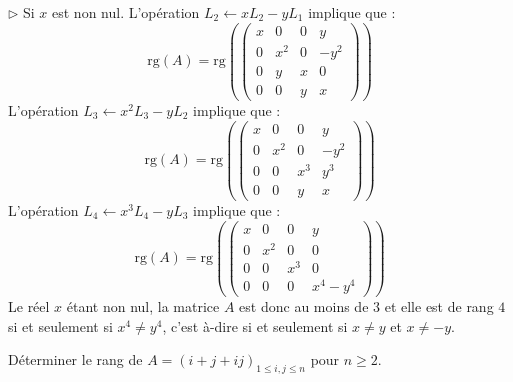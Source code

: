 \documentclass[a4paper,twoside,french,11pt]{VcCours}
\begin{document}
\noindent $\rhd$ Si $x$ est non nul. L'opération $L_2 \leftarrow x L_2 - y L_1$ implique que :
$$ \textrm{rg}(A) = \textrm{rg} \left(\begin{pmatrix}
x & 0 & 0& y \\
0 & x^2 & 0 & -y^2 \\
0 & y & x & 0 \\
0 & 0 & y & x
\end{pmatrix} \right)$$
L'opération $L_3 \leftarrow x^2 L_3-y L_2$ implique que :
$$ \textrm{rg}(A) = \textrm{rg} \left(\begin{pmatrix}
x & 0 & 0& y \\
0 & x^2 & 0 & -y^2 \\
0 & 0 & x^3 & y^3 \\
0 & 0 & y & x
\end{pmatrix} \right)$$
L'opération $L_4 \leftarrow x^3 L_4-y L_3$ implique que :
$$ \textrm{rg}(A) = \textrm{rg} \left(\begin{pmatrix}
x & 0 & 0& y \\
0 & x^2 & 0 & 0 \\
0 & 0 & x^3 & 0 \\
0 & 0 & 0 & x^4-y^4
\end{pmatrix} \right)$$
Le réel $x$ étant non nul, la matrice $A$ est donc au moins de $3$ et elle est de rang $4$ si et seulement si $x^4 \neq y^4$, c'est à-dire si et seulement si $x \neq y$ et $x \neq -y$.



\begin{Exercice}{} Déterminer le rang de $A=(i+j+ij)_{1\leq i,j\leq n}$ pour $n \geq 2$.
\end{Exercice} 
\end{document}
